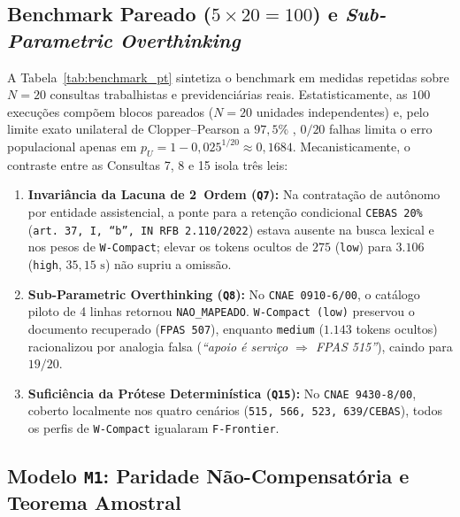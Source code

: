 \documentclass[10pt,twocolumn]{article}
\begin{document}
\subsection{Benchmark Pareado ($5 \times 20 = 100$) e \emph{Sub-Parametric Overthinking}}

A Tabela~\ref{tab:benchmark_pt} sintetiza o benchmark em medidas repetidas sobre $N=20$ consultas trabalhistas e previdenci\'arias reais. Estatisticamente, as $100$ execu\c{c}\~oes comp\~oem blocos pareados ($N=20$ unidades independentes) e, pelo limite exato unilateral de Clopper--Pearson a $97,5\%$ \cite{clopper1934use}, $0/20$ falhas limita o erro populacional apenas em $p_U = 1 - 0,025^{1/20} \approx 0,1684$. Mecanisticamente, o contraste entre as Consultas 7, 8 e 15 isola tr\^es leis:
\begin{enumerate}[leftmargin=*,nosep]
  \item \textbf{Invari\^ancia da Lacuna de 2\textordfeminine\ Ordem (\texttt{Q7}):} Na contrata\c{c}\~ao de aut\^onomo por entidade assistencial, a ponte para a reten\c{c}\~ao condicional \texttt{CEBAS 20\%} (\texttt{art.\ 37, I, ``b'', IN RFB 2.110/2022}) estava ausente na busca lexical e nos pesos de \texttt{W-Compact}; elevar os tokens ocultos de $275$ (\texttt{low}) para $3.106$ (\texttt{high}, $35,15\text{ s}$) n\~ao supriu a omiss\~ao.
  \item \textbf{Sub-Parametric Overthinking (\texttt{Q8}):} No \texttt{CNAE 0910-6/00}, o cat\'alogo piloto de 4 linhas retornou \texttt{NAO\_MAPEADO}. \texttt{W-Compact (low)} preservou o documento recuperado (\texttt{FPAS 507}), enquanto \texttt{medium} ($1.143$ tokens ocultos) racionalizou por analogia falsa (\emph{``apoio \'e servi\c{c}o $\Rightarrow$ FPAS 515''}), caindo para $19/20$.
  \item \textbf{Sufici\^encia da Pr\'otese Determin\'istica (\texttt{Q15}):} No \texttt{CNAE 9430-8/00}, coberto localmente nos quatro cen\'arios (\texttt{515, 566, 523, 639/CEBAS}), todos os perfis de \texttt{W-Compact} igualaram \texttt{F-Frontier}.
\end{enumerate}

\subsection{Modelo \texttt{M1}: Paridade N\~ao-Compensat\'oria e Teorema Amostral}
\end{document}

